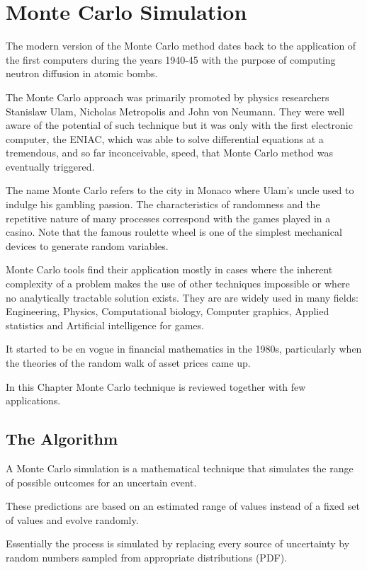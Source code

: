 \chapter{Monte Carlo Simulation}
\label{cap:montecarlo}

The modern version of the Monte Carlo method dates back to the application of the first computers during the years 1940-45 with the purpose of computing neutron diffusion in atomic bombs.

The Monte Carlo approach was primarily promoted by physics researchers Stanislaw Ulam, Nicholas Metropolis and John von Neumann. They were well aware of the potential of such technique but it was only with the first electronic computer, the ENIAC, which was able to solve differential equations at a tremendous, and so far inconceivable, speed, that Monte Carlo method was eventually triggered.

The name Monte Carlo refers to the city in Monaco where Ulam's uncle used to indulge his gambling passion. 
The characteristics of randomness and the repetitive nature of many processes correspond with the games played in a casino. Note that the famous roulette wheel is one of the simplest mechanical devices to generate random variables.

Monte Carlo tools find their application mostly in cases where the inherent complexity of a problem makes the use of other techniques impossible or where no analytically tractable solution exists.
They are are widely used in many fields: Engineering, Physics, Computational biology, Computer graphics, Applied statistics and Artificial intelligence for games.

It started to be en vogue in financial mathematics in the 1980s, particularly when the theories of the random walk of asset prices came up.

In this Chapter Monte Carlo technique is reviewed together with few applications.

\section{The Algorithm}
\label{whats-monte-carlo-simulation}

A Monte Carlo simulation is a mathematical technique that simulates the range of possible outcomes for an uncertain event.

These predictions are based on an estimated range of values instead of a fixed set of values and evolve randomly.

Essentially the process is simulated by replacing every source of uncertainty by random numbers sampled from appropriate distributions (PDF). %

